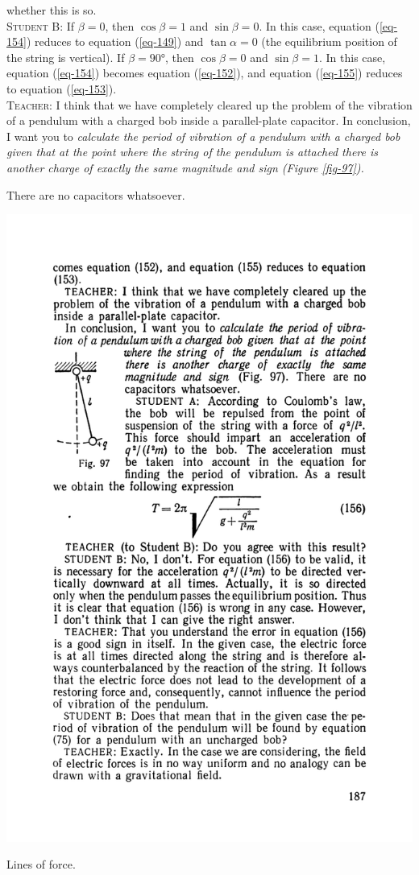 \documentclass[a4paper,sfsidenotes]{tufte-book}
\begin{document}
whether this is so.
\\
\textsc{Student B:} If $\beta=0$, then $ \cos \beta = 1$ and $\sin \beta=0$. In this case, equation (\ref{eq-154}) reduces to equation (\ref{eq-149}) and $\tan \alpha=0$ (the equilibrium position of the string is vertical). If $\beta =\ang{90}$, then $\cos \beta= 0$ and $\sin \beta=1$. In this case, equation (\ref{eq-154}) becomes equation (\ref{eq-152}), and equation (\ref{eq-155}) reduces to equation (\ref{eq-153}).
\\
\textsc{Teacher:} I think that we have completely cleared up the problem of the vibration of a pendulum with a charged bob inside a parallel-plate capacitor. In conclusion, I want you to \emph{calculate the period of vibration of a pendulum with a charged bob given that at the point where the string of the pendulum is attached there is another charge of exactly the same magnitude and sign (\emph{Figure \ref{fig-97}}).}

There are no capacitors whatsoever.
\begin{marginfigure}%
\centering
\includegraphics[width=.5\linewidth]{fig-097a}
\caption{Lines of force.}
\label{fig-97}
\end{marginfigure}
\end{document}
